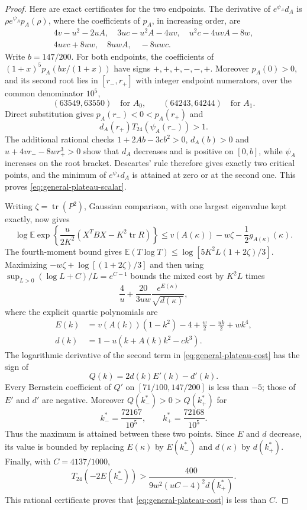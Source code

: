 \documentclass[11pt,a4paper]{article}
\numberwithin{equation}{section}
\begin{document}
\begin{proof}
Here are exact certificates for the two endpoints. The derivative of
$e^{\psi_A}d_A$ is $\rho e^{\psi_A}p_A(\rho)$, where the coefficients
of $p_A$, in increasing order, are
\[
 \begin{gathered}
 4v-u^2-2uA,\quad 3uc-u^2A-4uv,\quad u^2c-4uvA-8w,\\
 4uvc+8uw,\quad 8uwA,\quad -8uwc.
 \end{gathered}
\]
Write $b=147/200$. For both endpoints, the coefficients of
$(1+x)^5p_A(bx/(1+x))$ have signs $+,+,+,-,-,+$.
Moreover $p_A(0)>0$, and its second root lies in $[r_-,r_+]$ with
integer endpoint numerators, over the common denominator $10^5$,
\[
 (63549,63550)\quad\text{for }A_0,
 \qquad(64243,64244)\quad\text{for }A_1.
\]
Direct substitution gives $p_A(r_-)<0<p_A(r_+)$ and
\[
 d_A(r_+)T_{24}(\psi_A(r_-))>1.
\]
The additional rational checks
$1+2Ab-3cb^2>0$, $d_A(b)>0$ and
$u+4vr_--8wr_+^3>0$ show that $d_A$ decreases and is positive on
$[0,b]$, while $\psi_A$ increases on the root bracket.
Descartes' rule therefore gives exactly two critical points, and the
minimum of $e^{\psi_A}d_A$ is attained at zero or at the second one.
This proves \eqref{eq:general-plateau-scalar}.

Writing $\zeta=\operatorname{tr}(P^2)$, Gaussian comparison, with one
largest eigenvalue kept exactly, now gives
\[
 \log\mathbb E\exp\left\{\frac{u}{2K^2}
       (X^TBX-K^2\operatorname{tr}R)\right\}
 \le v(A(\kappa))-w\zeta-\frac12g_{A(\kappa)}(\kappa).
\]
The fourth-moment bound gives
$\mathbb E(T\log T)\le\log[5K^2L(1+2\zeta)/3]$.
Maximizing $-w\zeta+\log[(1+2\zeta)/3]$ and then using
$\sup_{L>0}(\log L+C)/L=e^{C-1}$ bounds the mixed cost by $K^2L$ times
\begin{equation}\label{eq:general-plateau-cost}
 \frac4u+\frac{20}{3uw}\frac{e^{E(\kappa)}}{\sqrt{d(\kappa)}},
\end{equation}
where the explicit quartic polynomials are
\[
 \begin{split}
 E(k)&=v(A(k))(1-k^2)-4+\frac w2-\frac{uk}{2}+wk^4,\\
 d(k)&=1-u(k+A(k)k^2-ck^3).
 \end{split}
\]
The logarithmic derivative of the second term in
\eqref{eq:general-plateau-cost} has the sign of
\[Q(k)=2d(k)E'(k)-d'(k).\]
Every Bernstein coefficient of $Q'$ on $[71/100,147/200]$ is less
than $-5$; those of $E'$ and $d'$ are negative.
Moreover $Q(k_-^*)>0>Q(k_+^*)$ for
\[
 k_-^*=\frac{72167}{10^5},\qquad
 k_+^*=\frac{72168}{10^5}.
\]
Thus the maximum is attained between these two points. Since $E$ and
$d$ decrease, its value is bounded by replacing $E(\kappa)$ by $E(k_-^*)$
and $d(\kappa)$ by $d(k_+^*)$. Finally, with $C=4137/1000$,
\[
 T_{24}(-2E(k_-^*))
 >\frac{400}{9w^2(uC-4)^2d(k_+^*)}.
\]
This rational certificate proves that \eqref{eq:general-plateau-cost}
is less than $C$.


\end{proof}
\end{document}
